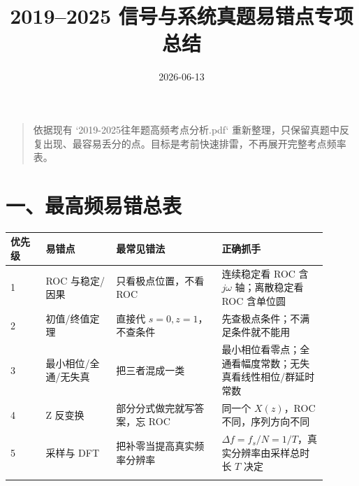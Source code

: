 \documentclass[11pt]{ctexart}
\title{2019--2025 信号与系统真题易错点专项总结}
\author{}
\date{2026-06-13}
\begin{document}
\maketitle



\begin{quote}\small 依据现有 `2019-2025往年题高频考点分析.pdf` 重新整理，只保留真题中反复出现、最容易丢分的点。目标是考前快速排雷，不再展开完整考点频率表。\end{quote}



\section*{一、最高频易错总表}



\begin{center}

\small

\begin{longtable}{p{0.10\linewidth} p{0.20\linewidth} p{0.30\linewidth} p{0.30\linewidth}}

\toprule

优先级 & 易错点 & 最常见错法 & 正确抓手 \\

\midrule

1 & ROC 与稳定/因果 & 只看极点位置，不看 ROC & 连续稳定看 ROC 含 \(j\omega\) 轴；离散稳定看 ROC 含单位圆 \\

\addlinespace[2pt]

2 & 初值/终值定理 & 直接代 \(s=0,z=1\)，不查条件 & 先查极点条件；不满足条件就不能用 \\

\addlinespace[2pt]

3 & 最小相位/全通/无失真 & 把三者混成一类 & 最小相位看零点；全通看幅度常数；无失真看线性相位/群延时常数 \\

\addlinespace[2pt]

4 & Z 反变换 & 部分分式做完就写答案，忘 ROC & 同一个 \(X(z)\)，ROC 不同，序列方向不同 \\

\addlinespace[2pt]

5 & 采样与 DFT & 把补零当提高真实频率分辨率 & \(\Delta f=f_s/N=1/T\)，真实分辨率由采样总时长 \(T\) 决定 \\

\addlinespace[2pt]


\end{longtable}
\end{center}
\end{document}

